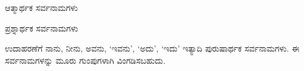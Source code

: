 \vspace{2.5pt plus 3pt minus 0.5pt}\noindent\hspace*{1.2em}\hspace{0.55em}ಆತ್ಮಾರ್ಥಕ ಸರ್ವನಾಮಗಳು\par

\vspace{2.5pt plus 3pt minus 0.5pt}\noindent\hspace*{1.2em}\hspace{0.55em}ಪ್ರಶ್ನಾರ್ಥಕ ಸರ್ವನಾಮಗಳು\par


\indent ಉದಾಹರಣೆಗೆ ನಾನು, ನೀನು, ಅವನು, ‘ಇವನು’, ‘ಅದು’, ‘ಇದು’ ಇತ್ಯಾದಿ ಪುರುಷಾರ್ಥಕ ಸರ್ವನಾಮಗಳು. ಈ ಸರ್ವನಾಮಗಳನ್ನು ಮೂರು ಗುಂಪುಗಳಾಗಿ ವಿಂಗಡಿಸಬಹುದು.\par
